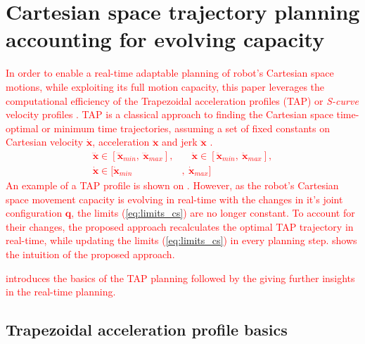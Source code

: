 



\section{Cartesian space trajectory planning accounting for evolving capacity}


\textcolor{red}{In order to enable a real-time adaptable planning of robot's Cartesian space motions, while exploiting its full motion capacity, this paper leverages the computational efficiency of the Trapezoidal acceleration profiles (TAP) or \textit{S-curve} velocity profiles \cite{ruckig}\cite{modernrobotics}\cite{scurve}. 
TAP is a classical approach to finding the Cartesian space time-optimal or minimum time\cite{Gasparetto2012} trajectories, assuming a set of fixed constants on Cartesian velocity $\dot{\bm{x}}$, acceleration $\ddot{\bm{x}}$ and jerk $\dddot{\bm{x}}$ \cite{Meckl1998,Garcia2017}. 
\begin{equation}
\begin{split}
 \dddot{\bm{x\!}}\! \in\![ \dddot{\bm{x}\!}_{min},  ~\dddot{\bm{x}\!}_{max}],&\quad
\ddot{\bm{x}} \! \in\! [\ddot{\bm{x}}_{min}, ~\ddot{\bm{x}}_{max}], \\ \dot{\bm{x}} \! \in\! [\dot{\bm{x}}_{min}&, ~\dot{\bm{x}}_{max}]
\end{split}
\label{eq:limits_cs}
\end{equation}
An example of a TAP profile is shown on .
}
\textcolor{red}{
However, as the robot's Cartesian space movement capacity is evolving in real-time with the changes in it's joint configuration $\bm{q}$, the limits (\ref{eq:limits_cs}) are no longer constant. To account for their changes, the proposed approach recalculates the optimal TAP trajectory in real-time, while updating the limits (\ref{eq:limits_cs}) in every planning step.  shows the intuition of the proposed approach.
}

\textcolor{red}{  introduces the basics of the TAP planning followed by the  giving further insights in the real-time planning. }


\subsection{Trapezoidal acceleration profile basics}\label{ch:tap}

